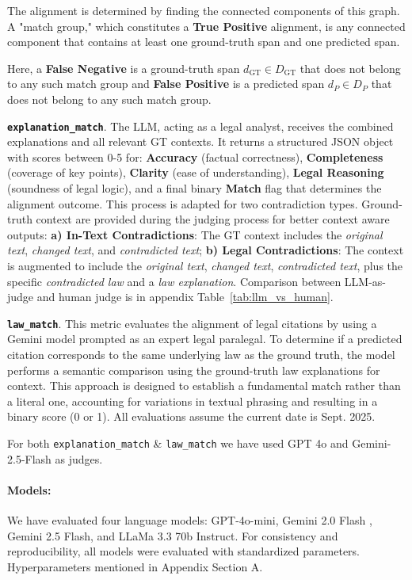 \documentclass[11pt]{article}
\begin{document}
The alignment is determined by finding the connected components of this graph. A "match group," which constitutes a \textbf{True Positive} alignment, is any connected component that contains at least one ground-truth span and one predicted span.


Here, a \textbf{False Negative} is a ground-truth span $d_{\text{GT}} \in D_{\text{GT}}$ that does not belong to any such match group and \textbf{False Positive} is a predicted span $d_{P} \in D_{P}$ that does not belong to any such match group.


\texttt{\textbf{explanation\_match}}. The LLM, acting as a legal analyst, receives the combined explanations and all relevant GT contexts. It returns a structured JSON object with scores between 0-5 for:
\textbf{Accuracy} (factual correctness),
\textbf{Completeness} (coverage of key points),
\textbf{Clarity} (ease of understanding),
\textbf{Legal Reasoning} (soundness of legal logic), and
a final binary \textbf{Match} flag that determines the alignment outcome. This process is adapted for two contradiction types. Ground-truth context are provided during the judging process for better context aware outputs: \textbf{a) In-Text Contradictions}: The GT context includes the \textit{original text}, \textit{changed text}, and \textit{contradicted text}; \textbf{b) Legal Contradictions}: The context is augmented to include the \textit{original text}, \textit{changed text}, \textit{contradicted text}, plus the specific \textit{contradicted law} and a \textit{law explanation}. Comparison between LLM-as-judge and human judge is in appendix Table~\ref{tab:llm_vs_human}.

\texttt{\textbf{law\_match}}. This metric evaluates the alignment of legal citations by using a Gemini model prompted as an expert legal paralegal. To determine if a predicted citation corresponds to the same underlying law as the ground truth, the model performs a semantic comparison using the ground-truth law explanations for context. This approach is designed to establish a fundamental match rather than a literal one, accounting for variations in textual phrasing and resulting in a binary score (0 or 1). All evaluations assume the current date is Sept. 2025.

For both \texttt{explanation\_match} \& \texttt{law\_match} we have used GPT 4o and Gemini-2.5-Flash as judges.   

\paragraph{Models:} We have evaluated four language models: GPT-4o-mini, Gemini 2.0 Flash \cite{geminiteam2025geminifamilyhighlycapable}, Gemini 2.5 Flash\cite{comanici2025gemini25pushingfrontier}, and LLaMa 3.3 70b Instruct\cite{grattafiori2024LLaMa3herdmodels}. For consistency and reproducibility, all models were evaluated with standardized parameters. Hyperparameters mentioned in Appendix Section A.
\end{document}
